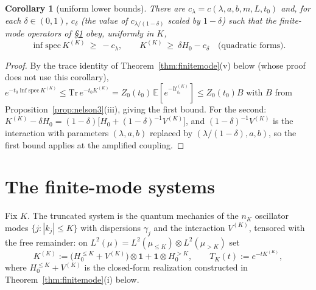 \documentclass[11pt,a4paper]{article}
\theoremstyle{plain}
\newtheorem{corollary}[theorem]{Corollary}
\theoremstyle{definition}
\newcommand{\E}{\mathbb{E}}
\newcommand{\U}{\mathcal U}
\newcommand{\Trace}{\mathrm{Tr}}
\newcommand{\muv}{\mu}
\begin{document}
\begin{corollary}[uniform lower bounds]\label{cor:lowerbounds}
There are $c_\lambda=c(\lambda,a,b,m,L,t_0)$ and, for each
$\delta\in(0,1)$, $c_\delta$ (the value of $c_{\lambda/(1-\delta)}$
scaled by $1-\delta$) such that the finite-mode operators of
\S\ref{sec:finitemode} obey, uniformly in $K$,
\[
 \inf\mathrm{spec}\,K^{(K)}\ \ge\ -c_\lambda,
 \qquad
 K^{(K)}\ \ge\ \delta H_0-c_\delta\quad\text{(quadratic forms)} .
\]
\end{corollary}

\begin{proof}
By the trace identity of Theorem~\ref{thm:finitemode}(v) below (whose
proof does not use this corollary),
$e^{-t_0\inf\mathrm{spec}\,K^{(K)}}\le\Trace\,e^{-t_0K^{(K)}}
=Z_0(t_0)\,\E[e^{-\U^{(K)}_{t_0}}]\le Z_0(t_0)B$
with $B$ from Proposition~\ref{prop:nelson3}(iii), giving the first
bound. For the second: $K^{(K)}-\delta H_0=(1-\delta)\bigl[H_0+
(1-\delta)^{-1}V^{(K)}\bigr]$, and $(1-\delta)^{-1}V^{(K)}$ is the
interaction with parameters $(\lambda,a,b)$ replaced by
$(\lambda/(1-\delta),a,b)$, so the first bound applies at the amplified
coupling.
\end{proof}

\section{The finite-mode systems}\label{sec:finitemode}

Fix $K$. The truncated system is the quantum mechanics of the $n_K$
oscillator modes $\{j:|k_j|\le K\}$ with dispersions $\gamma_j$ and the
interaction $V^{(K)}$, tensored with the free remainder: on
$L^2(\muv)=L^2(\muv_{\le K})\otimes L^2(\muv_{>K})$ set
\begin{equation}
 K^{(K)}:=\bigl(H_0^{\le K}+V^{(K)}\bigr)\otimes\mathbf 1
 +\mathbf 1\otimes H_0^{>K},
 \qquad
 T_K(t):=e^{-tK^{(K)}},
 \label{eq:KK}
\end{equation}
where $H_0^{\le K}+V^{(K)}$ is the closed-form realization constructed in
Theorem~\ref{thm:finitemode}(i) below.
\end{document}
